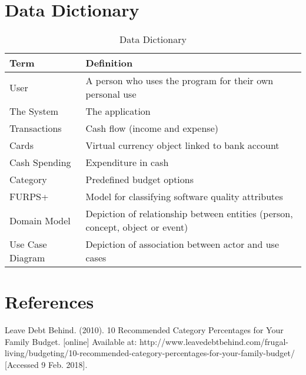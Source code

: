 \documentclass[12pt]{article}
\begin{document}
\clearpage


\section{Data Dictionary}

\begin{table}[H]
\begin{center}
\begin{tabular} {|p{3.5cm}|p{11.9cm}|}

\hline \textbf{Term} & \textbf{Definition} \\
\hline User & A person who uses the program for their own personal use \\
\hline The System  & The application\\
\hline Transactions & Cash flow (income and expense)\\
\hline Cards & Virtual currency object linked to bank account\\
\hline Cash Spending & Expenditure in cash\\
\hline Category & Predefined budget options \\
\hline FURPS+ & Model for classifying software quality attributes\\
\hline Domain Model & Depiction of relationship between entities (person, concept, object or event) \\
\hline Use Case Diagram & Depiction of association between actor and use cases \\
\hline
\end{tabular}
\caption{Data Dictionary}
\end{center}
\end{table}

\section{References}
Leave Debt Behind. (2010). 10 Recommended Category Percentages for Your Family Budget. [online] Available at: http://www.leavedebtbehind.com/frugal-living/budgeting/10-recommended-category-percentages-for-your-family-budget/ [Accessed 9 Feb. 2018].

\appendix
\end{document}

